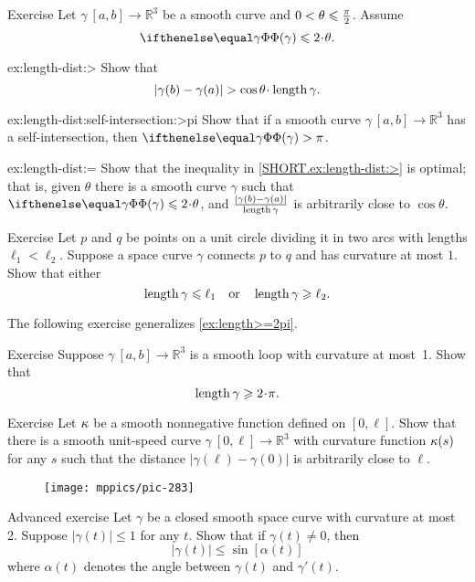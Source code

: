 \begin{thm}{Exercise}\label{ex:length-dist}
Let $\gamma\:[a,b]\to \mathbb{R}^3$ be a smooth curve and $0\z<\theta\z\le\tfrac\pi2$.
Assume 
\[\tc\gamma\le 2\cdot\theta.\]

\begin{subthm}{ex:length-dist:>} Show that
\[|\gamma(b)-\gamma(a)|> \cos\theta\cdot\length\gamma.\]
\end{subthm}

\begin{subthm}{ex:length-dist:self-intersection:>pi}
Show that if a smooth curve $\gamma\:[a,b]\to\mathbb{R}^3$ has a self-intersection, then $\tc\gamma>\pi$.
\end{subthm}


\begin{subthm}{ex:length-dist:=} Show that the inequality in \ref{SHORT.ex:length-dist:>} is optimal; that is, given 
$\theta$ there is a smooth curve $\gamma$ such that $\tc\gamma\le 
2\cdot\theta$, and $\frac{|\gamma(b)-\gamma(a)|}{\mathop{\rm length}\nolimits\gamma}$ is arbitrarily 
close to $\cos\theta$.
\end{subthm}

\end{thm}

\begin{thm}{Exercise}\label{ex:schwartz}
Let $p$ and $q$ be points on a unit circle dividing it in two arcs with lengths $\ell_1<\ell_2$.
Suppose a space curve $\gamma$ connects $p$ to $q$ and has curvature at most $1$.
Show that either
\[\mathop{\rm length}\nolimits \gamma\leqslant \ell_1
\quad\text{or}\quad
\mathop{\rm length}\nolimits \gamma\geqslant \ell_2.
\]
\end{thm}

The following exercise generalizes \ref{ex:length>=2pi}.

\begin{thm}{Exercise}\label{ex:loop}
Suppose $\gamma\:[a,b]\to \mathbb{R}^3$ is a smooth loop with curvature at most~1.
Show that 
\[\length\gamma\ge2\cdot\pi.\]

\end{thm}

\begin{thm}{Exercise}\label{ex:bow-upper}
Let $\kappa$ be a smooth nonnegative function defined on $[0,\ell]$.
Show that there is a smooth unit-speed curve $\gamma\:[0,\ell]\to\mathbb{R}^3$ with curvature function $\kappa(s)$ for any $s$ such that the distance $|\gamma(\ell)-\gamma(0)|$ is arbitrarily close to $\ell$.
\end{thm}

\begin{wrapfigure}{r}{39 mm}
\vskip-4mm
\centering
\texttt{[image: mppics/pic-283]}
\vskip0mm
\end{wrapfigure}

\begin{thm}{Advanced exercise}\label{ex:gromov-twist}
Let $\gamma$ be a closed smooth space curve with curvature at most 2.
Suppose $|\gamma(t)|\le 1$ for any $t$.
Show that if $\gamma(t)\ne 0$, then 
\[|\gamma(t)| \le \sin [\alpha(t)]\]
where $\alpha(t)$ denotes the angle between  $\gamma(t)$ and $\gamma'(t)$.
\end{thm}

